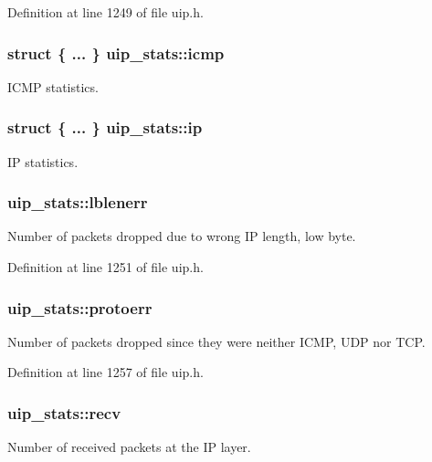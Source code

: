 Definition at line 1249 of file uip.h.

\hypertarget{structuip__stats_ae7d7511274145b127956a24d864cc71c}{
\subsubsection[{icmp}]{\setlength{\rightskip}{0pt plus 5cm}struct \{ ... \}   {\bf uip\_\-stats::icmp}}}
\label{structuip__stats_ae7d7511274145b127956a24d864cc71c}
ICMP statistics. \hypertarget{structuip__stats_a5db1a5af2cd3ba9a1090a802c2ab73b0}{
\subsubsection[{ip}]{\setlength{\rightskip}{0pt plus 5cm}struct \{ ... \}   {\bf uip\_\-stats::ip}}}
\label{structuip__stats_a5db1a5af2cd3ba9a1090a802c2ab73b0}
IP statistics. \hypertarget{structuip__stats_a6157452bdc9921f44b2e22e4b5969258}{
\subsubsection[{lblenerr}]{ {\bf uip\_\-stats::lblenerr}}}
\label{structuip__stats_a6157452bdc9921f44b2e22e4b5969258}
Number of packets dropped due to wrong IP length, low byte. 

Definition at line 1251 of file uip.h.

\hypertarget{structuip__stats_ab4622e2599ff3a592db09219b2641682}{
\subsubsection[{protoerr}]{ {\bf uip\_\-stats::protoerr}}}
\label{structuip__stats_ab4622e2599ff3a592db09219b2641682}
Number of packets dropped since they were neither ICMP, UDP nor TCP. 

Definition at line 1257 of file uip.h.

\hypertarget{structuip__stats_a7f7bb2145afba5df00c6e10ddefa8ae1}{
\subsubsection[{recv}]{ {\bf uip\_\-stats::recv}}}
\label{structuip__stats_a7f7bb2145afba5df00c6e10ddefa8ae1}
Number of received packets at the IP layer.

